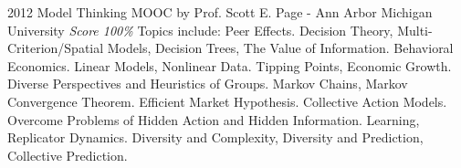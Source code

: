 \documentclass[11pt,a4paper]{moderncv}
\begin{document}
\cventry                                                          %
    {2012}                                                          %
    {Model Thinking}                                                          %
    {MOOC by Prof. Scott E. Page - Ann Arbor}                                                          %
    {Michigan University}                                                          %
    {                                                          %
        \textit{Score 100\%} %
    }                                                          %
    {
        Topics include:                                                          %
            Peer Effects.                                                        %
            Decision Theory,                                                     %
            Multi-Criterion/Spatial Models,                                      %
            Decision Trees,                                                      %
            The Value of Information.                                            %
            Behavioral Economics.                                                %
            Linear Models,                                                       %
            Nonlinear Data.                                                      %
            Tipping Points,                                                      %
            Economic Growth.                                                     %
            Diverse Perspectives and Heuristics of Groups.                       %
            Markov Chains,                                                       %
            Markov Convergence Theorem.                                          %
            Efficient Market Hypothesis.                                         %
            Collective Action Models.                                            %
            Overcome Problems of Hidden Action and Hidden Information.           %
            Learning,                                                            %
            Replicator Dynamics.                                                 %
            Diversity and Complexity,                                            %
            Diversity and Prediction,                                            %
       Collective Prediction.                                                    %
    }                                                          %
\end{document}
